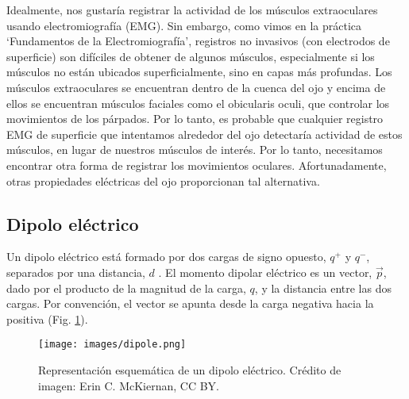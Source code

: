 \documentclass[12pt]{article}
\begin{document}
Idealmente, nos gustaría registrar la actividad de los músculos
extraoculares usando electromiografía (EMG). Sin embargo, como vimos
en la práctica `Fundamentos de la Electromiografía', registros no
invasivos (con electrodos de superficie) son difíciles de obtener de
algunos músculos, especialmente si los músculos no están ubicados
superficialmente, sino en capas más profundas. Los músculos
extraoculares se encuentran dentro de la cuenca del ojo y encima de
ellos se encuentran músculos faciales como el obicularis oculi, que
controlar los movimientos de los párpados. Por lo tanto, es probable
que cualquier registro EMG de superficie que intentamos alrededor del
ojo detectaría actividad de estos músculos, en lugar de nuestros
músculos de interés. Por lo tanto, necesitamos encontrar otra
forma de registrar los movimientos oculares. Afortunadamente, otras
propiedades eléctricas del ojo proporcionan tal alternativa.


\subsection*{Dipolo eléctrico}
Un dipolo eléctrico está formado por dos cargas de signo opuesto,
$q^+$ y $q^-$, separados por una distancia, $d$
\cite{hyperphysicsDipole}. El momento dipolar eléctrico es un vector,
$\vec{p}$, dado por el producto de la magnitud de la carga, $q$, y la
distancia entre las dos cargas. Por convención, el vector se apunta
desde la carga negativa hacia la positiva (Fig. \ref{fig:dipole}).

\begin{figure}[h!]
\centering
\texttt{[image: images/dipole.png]}
\caption{Representación esquemática de un dipolo eléctrico. Crédito de
  imagen: Erin C. McKiernan, CC BY.}
\label{fig:dipole}
\end{figure}
\end{document}
